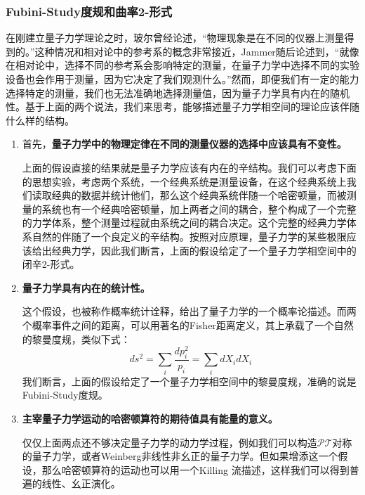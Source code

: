\documentclass[supercite]{HustGraduPaper}
\begin{document}
	\subsubsection{Fubini-Study度规和曲率2-形式}
	在刚建立量子力学理论之时，玻尔曾经论述，“物理现象是在不同的仪器上测量得到的。”这种情况和相对论中的参考系的概念非常接近，Jammer随后论述到\cite{jammer1974philosophy}，“就像在相对论中，选择不同的参考系会影响特定的测量，在量子力学中选择不同的实验设备也会作用于测量，因为它决定了我们观测什么。”然而，即便我们有一定的能力选择特定的测量，我们也无法准确地选择测量值，因为量子力学具有内在的随机性。基于上面的两个说法，我们来思考，能够描述量子力学相空间的理论应该伴随什么样的结构。
	\begin{enumerate}
		\item 首先，\textbf{量子力学中的物理定律在不同的测量仪器的选择中应该具有不变性。}
		
	   上面的假设直接的结果就是量子力学应该有内在的辛结构。我们可以考虑下面的思想实验，考虑两个系统，一个经典系统是测量设备，在这个经典系统上我们读取经典的数据并统计他们，那么这个经典系统伴随一个哈密顿量，而被测量的系统也有一个经典哈密顿量，加上两者之间的耦合，整个构成了一个完整的力学体系，整个测量过程就由系统之间的耦合决定。这个完整的经典力学体系自然的伴随了一个良定义的辛结构。按照对应原理，量子力学的某些极限应该给出经典力学，因此我们断言，上面的假设给定了一个量子力学相空间中的闭辛2-形式\cite{brody2001geometric}。
	   
	   \item  \textbf{量子力学具有内在的统计性。}
	   
	   这个假设，也被称作概率统计诠释，给出了量子力学的一个概率论描述。而两个概率事件之间的距离，可以用著名的Fisher距离定义，其上承载了一个自然的黎曼度规，类似下式：
	   \begin{equation}
	   ds^2= \sum_i \frac{dp_i^2}{p_i} = \sum_i dX_i dX_i
	   \end{equation}
	   我们断言，上面的假设给定了一个量子力学相空间中的黎曼度规，准确的说是Fubini-Study度规。
	   
	   \item \textbf{主宰量子力学运动的哈密顿算符的期待值具有能量的意义。}
	   
	   仅仅上面两点还不够决定量子力学的动力学过程，例如我们可以构造$\mathcal{PT}$对称的量子力学\cite{bender1999pt}，或者Weinberg非线性非幺正的量子力学\cite{polchinski1991weinberg,weinberg1989testing}。但如果增添这一个假设，那么哈密顿算符的运动也可以用一个Killing 流描述，这样我们可以得到普遍的线性、幺正演化。
	   
		
	\end{enumerate}
	
\end{document}

